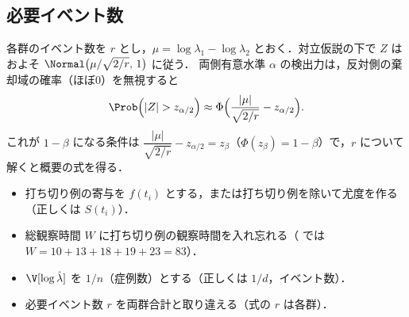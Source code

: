 \subsection{必要イベント数}\label{subsec:m01-events}
各群のイベント数を $r$ とし，$\mu=\log\lambda_1-\log\lambda_2$ とおく．対立仮説の下で $Z$ はおよそ $\Normal\bigl(\mu/\sqrt{2/r},\,1\bigr)$ に従う．
両側有意水準 $\alpha$ の検出力は，反対側の棄却域の確率（ほぼ0）を無視すると
\[
\Prob\Bigl(|Z|>z_{\alpha/2}\Bigr)\approx\Phi\Bigl(\frac{|\mu|}{\sqrt{2/r}}-z_{\alpha/2}\Bigr).
\]
これが $1-\beta$ になる条件は $\dfrac{|\mu|}{\sqrt{2/r}}-z_{\alpha/2}=z_\beta$（$\Phi(z_\beta)=1-\beta$）で，$r$ について解くと概要の式を得る．

\begin{warnbox}
\begin{itemize}
\item 打ち切り例の寄与を $f(t_i)$ とする，または打ち切り例を除いて尤度を作る（正しくは $S(t_i)$）．
\item 総観察時間 $W$ に打ち切り例の観察時間を入れ忘れる（ では $W=10+13+18+19+23=83$）．
\item $\V[\log\hat\lambda]$ を $1/n$（症例数）とする（正しくは $1/d$，イベント数）．
\item 必要イベント数 $r$ を両群合計と取り違える（式の $r$ は各群）．
\end{itemize}
\end{warnbox}

